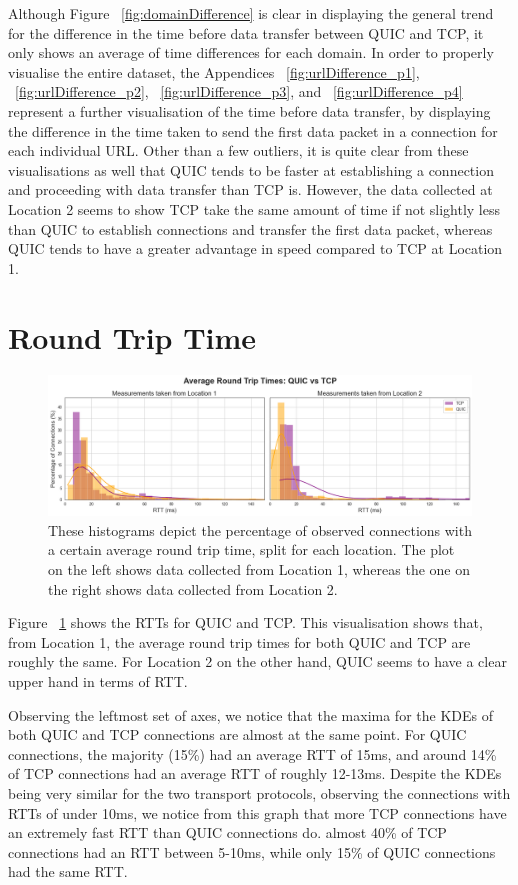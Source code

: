 \documentclass{l4proj}
\begin{document}
Although Figure ~\ref{fig:domainDifference} is clear in displaying the general trend for the difference in the time before data transfer between QUIC and TCP, it only shows an average of time differences for each domain. In order to properly visualise the entire dataset, the Appendices ~\ref{fig:urlDifference_p1}, ~\ref{fig:urlDifference_p2}, ~\ref{fig:urlDifference_p3}, and ~\ref{fig:urlDifference_p4} represent a further visualisation of the time before data transfer, by displaying the difference in the time taken to send the first data packet in a connection for each individual URL. Other than a few outliers, it is quite clear from these visualisations as well that QUIC tends to be faster at establishing a connection and proceeding with data transfer than TCP is. However, the data collected at Location 2 seems to show TCP take the same amount of time if not slightly less than QUIC to establish connections and transfer the first data packet, whereas QUIC tends to have a greater advantage in speed compared to TCP at Location 1.


\section{Round Trip Time}


\begin{figure}
    \centering
    \includegraphics[width=1\linewidth]{images/RTTs.png}
    \caption{These histograms depict the percentage of observed connections with a certain average round trip time, split for each location. The plot on the left shows data collected from Location 1, whereas the one on the right shows data collected from Location 2.}
    \label{fig:RTTs}
\end{figure}

Figure ~\ref{fig:RTTs} shows the RTTs for QUIC and TCP. This visualisation shows that, from Location 1, the average round trip times for both QUIC and TCP are roughly the same. For Location 2 on the other hand, QUIC seems to have a clear upper hand in terms of RTT.

Observing the leftmost set of axes, we notice that the maxima for the KDEs of both QUIC and TCP connections are almost at the same point. For QUIC connections, the majority (15\%) had an average RTT of 15ms, and around 14\% of TCP connections had an average RTT of roughly 12-13ms. Despite the KDEs being very similar for the two transport protocols, observing the connections with RTTs of under 10ms, we notice from this graph that more TCP connections have an extremely fast RTT than QUIC connections do. almost 40\% of TCP connections had an RTT between 5-10ms, while only 15\% of QUIC connections had the same RTT. 
\end{document}
